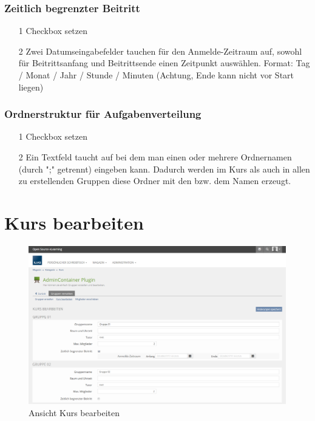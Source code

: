 \subsubsection*{Zeitlich begrenzter Beitritt}
\begin{itemize}
	\item[1] Checkbox setzen 
	\item[2] Zwei Datumseingabefelder tauchen für den Anmelde-Zeitraum auf, sowohl für Beitrittsanfang und Beitrittsende einen Zeitpunkt auswählen. Format: Tag / Monat / Jahr / Stunde / Minuten 
	(Achtung, Ende kann nicht vor Start liegen)
	
\end{itemize}

\subsubsection*{Ordnerstruktur für Aufgabenverteilung}
\begin{itemize}
	\item[1] Checkbox setzen 
	\item[2] Ein Textfeld taucht auf bei dem man einen oder mehrere Ordnernamen (durch ";" getrennt) eingeben kann. Dadurch werden im Kurs als auch in allen zu erstellenden Gruppen diese Ordner mit den bzw. dem Namen erzeugt.
	
\end{itemize}
\clearpage

\section{Kurs bearbeiten}
\begin{figure}
	\centering
	\includegraphics[width=1\textwidth]{img/kursBearbeiten.png}
	\caption{Ansicht Kurs bearbeiten}
\end{figure}


